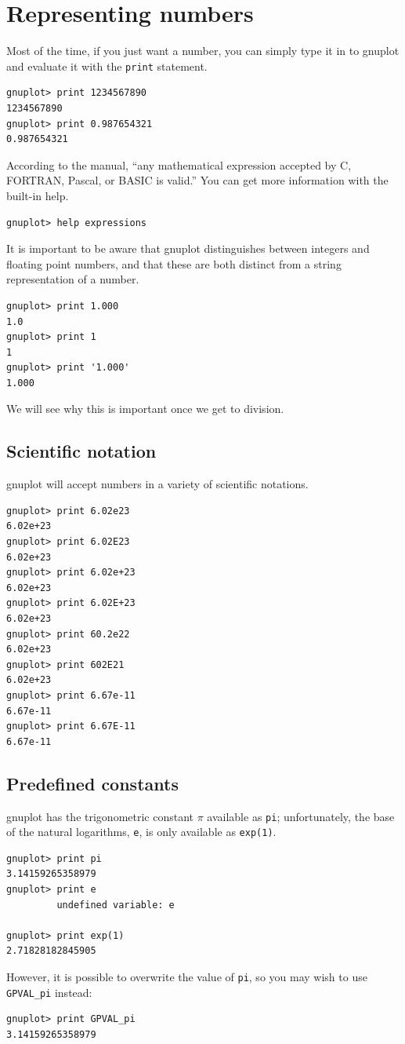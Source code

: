 \documentclass[11pt,letterpaper]{report}
\begin{document}
\chapter{Representing numbers}
Most of the time, if you just want a number, you can simply type it in to gnuplot and evaluate it with the \verb+print+ statement.
\begin{lstlisting}
gnuplot> print 1234567890
1234567890
gnuplot> print 0.987654321
0.987654321
\end{lstlisting}


According to the manual, ``any mathematical expression accepted by C, FORTRAN, Pascal, or BASIC is valid.'' You can get more information with the built-in help.
\begin{lstlisting}
gnuplot> help expressions
\end{lstlisting}
It is important to be aware that gnuplot distinguishes between integers and floating point numbers, and that these are both distinct from a string representation of a number.
\begin{lstlisting}
gnuplot> print 1.000
1.0
gnuplot> print 1
1
gnuplot> print '1.000'
1.000
\end{lstlisting}
We will see why this is important once we get to division.
\section{Scientific notation}
gnuplot will accept numbers in a variety of scientific notations.
\begin{lstlisting}
gnuplot> print 6.02e23
6.02e+23
gnuplot> print 6.02E23
6.02e+23
gnuplot> print 6.02e+23
6.02e+23
gnuplot> print 6.02E+23
6.02e+23
gnuplot> print 60.2e22
6.02e+23
gnuplot> print 602E21
6.02e+23
gnuplot> print 6.67e-11
6.67e-11
gnuplot> print 6.67E-11
6.67e-11
\end{lstlisting}


\section{Predefined constants}

gnuplot has the trigonometric constant $\pi$ available as \verb+pi+; unfortunately, the base of the natural logarithms, \verb+e+, is only available as \verb+exp(1)+.
\begin{lstlisting}
gnuplot> print pi
3.14159265358979
gnuplot> print e
         undefined variable: e

gnuplot> print exp(1)
2.71828182845905
\end{lstlisting}
However, it is possible to overwrite the value of \verb+pi+, so you may wish to use \verb+GPVAL_pi+ instead:
\begin{lstlisting}
gnuplot> print GPVAL_pi
3.14159265358979
\end{lstlisting}
\end{document}
